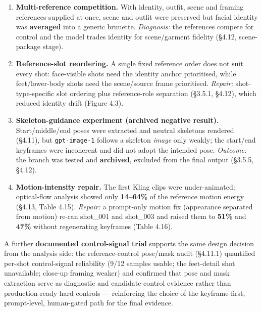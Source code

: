 \documentclass[10pt,twocolumn,letterpaper]{article}
\begin{document}
\begin{enumerate}[leftmargin=1.4em,itemsep=2pt,topsep=2pt]

\item \textbf{Multi-reference competition.} With identity, outfit, scene and framing references supplied at once, scene and outfit were preserved but facial identity was \textbf{averaged} into a generic brunette. \emph{Diagnosis:} the references compete for control and the model trades identity for scene/garment fidelity (\S{}4.12, scene-package stage).

\item \textbf{Reference-slot reordering.} A single fixed reference order does not suit every shot: face-visible shots need the identity anchor prioritised, while feet/lower-body shots need the scene/source frame prioritised. \emph{Repair:} shot-type-specific slot ordering plus reference-role separation (\S{}3.5.1, \S{}4.12), which reduced identity drift (Figure 4.3).

\item \textbf{Skeleton-guidance experiment (archived negative result).} Start/middle/end poses were extracted and neutral skeletons rendered (\S{}4.11), but \texttt{gpt-image-1} follows a skeleton \emph{image} only weakly; the start/end keyframes were incoherent and did not adopt the intended pose. \emph{Outcome:} the branch was tested and \textbf{archived}, excluded from the final output (\S{}3.5.5, \S{}4.12).

\item \textbf{Motion-intensity repair.} The first Kling clips were under-animated; optical-flow analysis showed only \textbf{14--64\%} of the reference motion energy (\S{}4.13, Table 4.15). \emph{Repair:} a prompt-only motion fix (appearance separated from motion) re-ran shot\_001 and shot\_003 and raised them to \textbf{51\%} and \textbf{47\%} without regenerating keyframes (Table 4.16).

\end{enumerate}

A further \textbf{documented control-signal trial} supports the same design decision from the analysis side: the reference-control pose/mask audit (\S{}4.11.1) quantified per-shot control-signal reliability (9/12 samples usable; the feet-detail shot unavailable; close-up framing weaker) and confirmed that pose and mask extraction serve as diagnostic and candidate-control evidence rather than production-ready hard controls --- reinforcing the choice of the keyframe-first, prompt-level, human-gated path for the final evidence.
\end{document}
